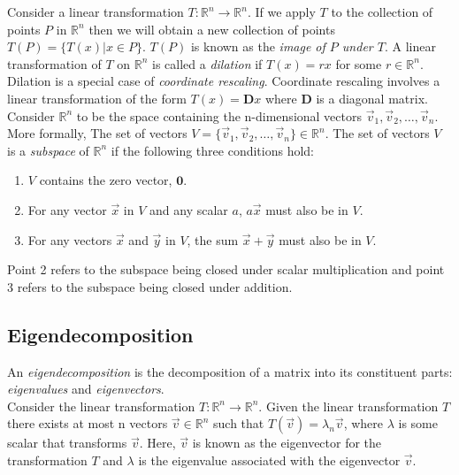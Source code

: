 \documentclass[12pt]{article}
\begin{document}
Consider a linear transformation $T:\mathbb{R}^n\rightarrow\mathbb{R}^n$. If we apply $T$ to the collection of points $P$ in $\mathbb{R}^n$ then we will obtain a new collection of points $T(P)=\{ T(x)|x\in P \}$. $T(P)$ is known as the \emph{image of $P$ under $T$}. A linear transformation of $T$ on $\mathbb{R}^n$ is called a \emph{dilation} if $T(x)=rx$ for some $r\in\mathbb{R}^n$. Dilation is a special case of \emph{coordinate rescaling}. Coordinate rescaling involves a linear transformation of the form $T(x)=\mathbf{D}x$ where $\mathbf{D}$ is a diagonal matrix.  \\

Consider $\mathbb{R}^n$ to be the space containing the n-dimensional vectors $\vec{v}_1,\vec{v}_2,\ldots,\vec{v}_n$. More formally, The set of vectors $V=\{\vec{v}_1,\vec{v}_2,\ldots,\vec{v}_n\}\in\mathbb{R}^n$. The set of vectors $V$ is a \emph{subspace} of $\mathbb{R}^n$ if the following three conditions hold:
\begin{enumerate}
\item $V$ contains the zero vector, $\mathbf{0}$. 
\item For any vector $\vec{x}$ in $V$ and any scalar $a$, $a\vec{x}$ must also be in $V$.
\item For any vectors $\vec{x}$ and $\vec{y}$ in $V$, the sum $\vec{x}+\vec{y}$ must also be in $V$. \\
\end{enumerate}

Point 2 refers to the subspace being closed under scalar multiplication and point 3 refers to the subspace being closed under addition.

\subsection{Eigendecomposition}

An \emph{eigendecomposition} is the decomposition of a matrix into its constituent parts: \emph{eigenvalues} and \emph{eigenvectors}.\\

Consider the linear transformation $T:\mathbb{R}^n\rightarrow\mathbb{R}^n$. Given the linear transformation $T$ there exists at most n vectors $\vec{v}\in\mathbb{R}^n$ such that $T(\vec{v})=\lambda_n \vec{v}$, where $\lambda$ is some scalar that transforms $\vec{v}$. Here, $\vec{v}$ is known as the eigenvector for the transformation $T$ and $\lambda$ is the eigenvalue associated with the eigenvector $\vec{v}$.
\end{document}

